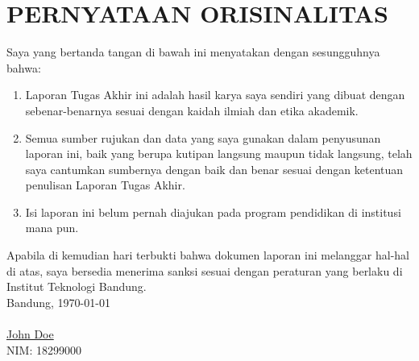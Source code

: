 \chapter*{PERNYATAAN ORISINALITAS}
\vspace{2cm}
Saya yang bertanda tangan di bawah ini menyatakan dengan sesungguhnya bahwa:
\begin{enumerate}
    \item Laporan Tugas Akhir ini adalah hasil karya saya sendiri yang dibuat dengan sebenar-benarnya sesuai dengan kaidah ilmiah dan etika akademik.
    \item Semua sumber rujukan dan data yang saya gunakan dalam penyusunan laporan ini, baik yang berupa kutipan langsung maupun tidak langsung, telah saya cantumkan sumbernya dengan baik dan benar sesuai dengan ketentuan penulisan Laporan Tugas Akhir.
    \item Isi laporan ini belum pernah diajukan pada program pendidikan di institusi mana pun.
\end{enumerate}
Apabila di kemudian hari terbukti bahwa dokumen laporan ini melanggar hal-hal di atas, saya bersedia menerima sanksi sesuai dengan peraturan yang berlaku di Institut Teknologi Bandung.
\\[2cm]
Bandung, \today\\
\\[1cm]

\underline{John Doe} \\
NIM: 18299000
  